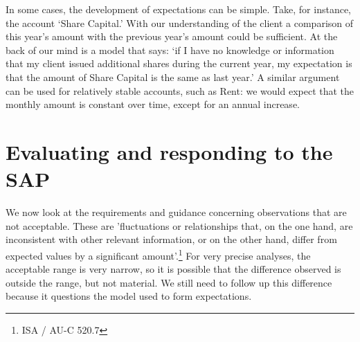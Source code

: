 In some cases, the development of expectations can be simple. Take, for instance, the account ‘Share Capital.’ With our understanding of the client a comparison of this year’s amount with the previous year’s amount could be sufficient. At the back of our mind is a model that says: ‘if I have no knowledge or information that my client issued additional shares during the current year, my expectation is that the amount of Share Capital is the same as last year.’ A similar argument can be used for relatively stable accounts, such as Rent: we would expect that the monthly amount is constant over time,  except for an annual increase.



\section{Evaluating and responding to the SAP} %
\label{sec:evaluation_and_response}

We now look at the requirements and guidance concerning observations that are not acceptable. These are 'fluctuations or relationships that, on the one hand, are inconsistent with other relevant information, or on the other hand, differ from expected values by a significant amount'.\footnote{ISA / AU-C 520.7} For very precise analyses, the acceptable range is very narrow, so it is possible that the difference observed is outside the range, but not material. We still need to follow up this difference because it questions the model used to form expectations.

